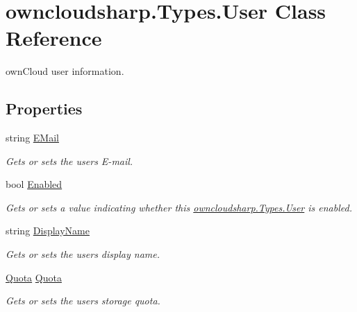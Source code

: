 \hypertarget{classowncloudsharp_1_1_types_1_1_user}{}\section{owncloudsharp.\+Types.\+User Class Reference}
\label{classowncloudsharp_1_1_types_1_1_user}


own\+Cloud user information.  


\subsection*{Properties}
\begin{DoxyCompactItemize}
\item 
string \hyperlink{classowncloudsharp_1_1_types_1_1_user_a0097e87f516a0b813b3d893dfaaadafe}{E\+Mail}
\begin{DoxyCompactList}\small\item\em Gets or sets the users E-\/mail. \end{DoxyCompactList}\item 
bool \hyperlink{classowncloudsharp_1_1_types_1_1_user_a904f26790c73cbc0c6160ed46b160fbd}{Enabled}
\begin{DoxyCompactList}\small\item\em Gets or sets a value indicating whether this \hyperlink{classowncloudsharp_1_1_types_1_1_user}{owncloudsharp.\+Types.\+User} is enabled. \end{DoxyCompactList}\item 
string \hyperlink{classowncloudsharp_1_1_types_1_1_user_a9b885e34f7c1e695e5d9867931b64d9c}{Display\+Name}
\begin{DoxyCompactList}\small\item\em Gets or sets the users display name. \end{DoxyCompactList}\item 
\hyperlink{classowncloudsharp_1_1_types_1_1_quota}{Quota} \hyperlink{classowncloudsharp_1_1_types_1_1_user_aff24ca447feae66be8ef929cd94a2d21}{Quota}
\begin{DoxyCompactList}\small\item\em Gets or sets the users storage quota. \end{DoxyCompactList}\end{DoxyCompactItemize}


